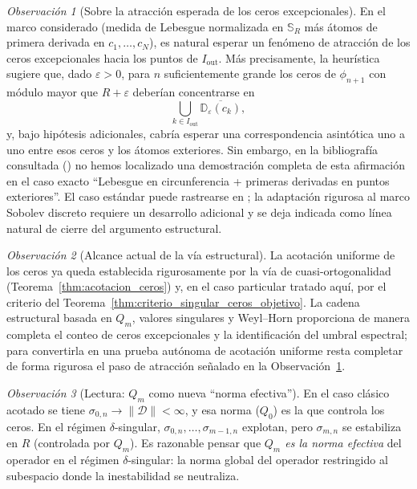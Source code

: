 \documentclass[12pt,a4paper]{article}
\theoremstyle{definition}
\theoremstyle{remark}
\newtheorem{remark}{Observación}
\newcommand{\D}{\mathcal{D}}
\begin{document}
\begin{remark}[Sobre la atracción esperada de los ceros excepcionales]\label{rem:atraccion_esperada}
  En el marco considerado (medida de Lebesgue normalizada en $\mathbb{S}_R$ más átomos de primera derivada en $c_1,\dots,c_N$), es natural esperar un fenómeno de atracción de los ceros excepcionales hacia los puntos de $I_{\mathrm{out}}$. Más precisamente, la heurística sugiere que, dado $\varepsilon>0$, para $n$ suficientemente grande los ceros de $\phi_{n+1}$ con módulo mayor que $R+\varepsilon$ deberían concentrarse en
  \[
    \bigcup_{k\in I_{\mathrm{out}}}\overline{\mathbb{D}_{\varepsilon}(c_k)},
  \]
  y, bajo hipótesis adicionales, cabría esperar una correspondencia asintótica uno a uno entre esos ceros y los átomos exteriores. Sin embargo, en la bibliografía consultada (\cite{lopez1999zero,lopez2001sobolev,marcellan2015sobolev}) no hemos localizado una demostración completa de esta afirmación en el caso exacto ``Lebesgue en circunferencia + primeras derivadas en puntos exteriores''. El caso estándar puede rastrearse en \cite[Cap.~5]{stahl1992general}; la adaptación rigurosa al marco Sobolev discreto requiere un desarrollo adicional y se deja indicada como línea natural de cierre del argumento estructural.
\end{remark}

\begin{remark}[Alcance actual de la vía estructural]\label{rem:alcance_via_Q_m}
  La acotación uniforme de los ceros ya queda establecida rigurosamente por la vía de cuasi-ortogonalidad (Teorema~\ref{thm:acotacion_ceros}) y, en el caso particular tratado aquí, por el criterio del Teorema~\ref{thm:criterio_singular_ceros_objetivo}. La cadena estructural basada en $Q_m$, valores singulares y Weyl--Horn proporciona de manera completa el conteo de ceros excepcionales y la identificación del umbral espectral; para convertirla en una prueba autónoma de acotación uniforme resta completar de forma rigurosa el paso de atracción señalado en la Observación~\ref{rem:atraccion_esperada}.
\end{remark}

\begin{remark}[Lectura: $Q_m$ como nueva ``norma efectiva'']\label{rem:Q_m_norma_efectiva}
  En el caso clásico acotado se tiene $\sigma_{0,n}\to\|\D\|<\infty$, y esa norma ($Q_0$) es la que controla los ceros. En el régimen $\delta$-singular, $\sigma_{0,n},\dots,\sigma_{m-1,n}$ explotan, pero $\sigma_{m,n}$ se estabiliza en $R$ (controlada por $Q_m$). Es razonable pensar que \emph{$Q_m$ es la norma efectiva} del operador en el régimen $\delta$-singular: la norma global del operador restringido al subespacio donde la inestabilidad se neutraliza.
\end{remark}
\end{document}
